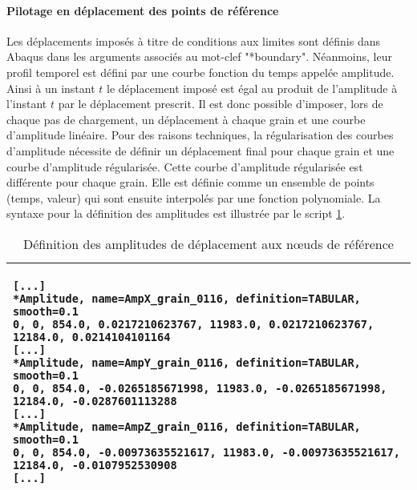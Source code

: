 \paragraph{Pilotage en déplacement des points de référence\\}
Les déplacements imposés à titre de conditions aux limites sont définis dans Abaqus dans les arguments associés au mot-clef "*boundary". Néanmoins, leur profil temporel est défini par une courbe fonction du temps appelée amplitude. Ainsi à un instant $t$ le déplacement imposé est égal au produit de l'amplitude à l'instant $t$ par le déplacement prescrit. Il est donc possible d'imposer, lors de chaque pas de chargement, un déplacement  à chaque grain et une courbe d'amplitude linéaire. Pour des raisons techniques, la régularisation des courbes d'amplitude nécessite de définir un déplacement final pour chaque grain et une courbe d'amplitude régularisée. Cette courbe d'amplitude régularisée est différente pour chaque grain. Elle est définie comme un ensemble de points (temps, valeur) qui sont ensuite interpolés par une fonction polynomiale. La syntaxe pour la définition des amplitudes est illustrée par le script \ref{script05:amplitudes}.
\begin{table}[h]\centering
	\begin{tabular}{p{}}
		\hline
		\begin{lstlisting}[language={}, breaklines=true]
[...]
*Amplitude, name=AmpX_grain_0116, definition=TABULAR, smooth=0.1
0, 0, 854.0, 0.0217210623767, 11983.0, 0.0217210623767, 12184.0, 0.0214104101164
[...]
*Amplitude, name=AmpY_grain_0116, definition=TABULAR, smooth=0.1
0, 0, 854.0, -0.0265185671998, 11983.0, -0.0265185671998, 12184.0, -0.0287601113288
[...]
*Amplitude, name=AmpZ_grain_0116, definition=TABULAR, smooth=0.1
0, 0, 854.0, -0.00973635521617, 11983.0, -0.00973635521617, 12184.0, -0.0107952530908
[...]
		\end{lstlisting}\\
		\hline
	\end{tabular}
	\caption{\label{script05:amplitudes}Définition des amplitudes de déplacement aux n\oe{}uds de référence}
\end{table}

